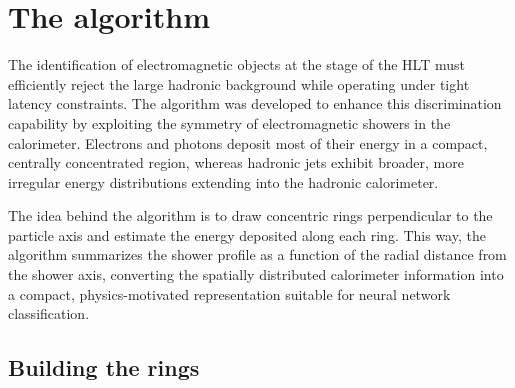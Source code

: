\section{The \rnn{} algorithm}%
\label{sec:neuralringer}

The identification of electromagnetic objects at the \fastcalo{} stage of the HLT must efficiently reject the large hadronic background while operating under tight latency constraints.
The \rnn{} algorithm was developed to enhance this discrimination capability by exploiting the symmetry of electromagnetic showers in the calorimeter. Electrons and photons deposit most of their energy in a compact, centrally concentrated region, whereas hadronic jets exhibit broader, more irregular energy distributions extending into the hadronic calorimeter.

The idea behind the \rnn{} algorithm is to draw concentric rings perpendicular to the particle axis and estimate the energy deposited along each ring. This way, the algorithm summarizes the shower profile as a function of the radial distance from the shower axis, converting the spatially distributed calorimeter information into a compact, physics-motivated representation suitable for neural network classification. 


% 

\subsection{Building the rings}\label{ssec:rnn_for_online_and_eletrons}

%

